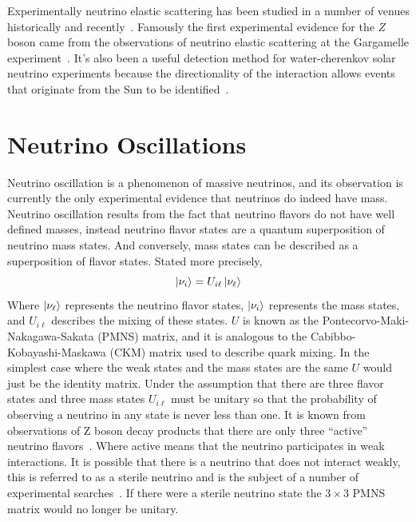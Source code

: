 Experimentally neutrino elastic scattering has been studied in a number
of venues historically and recently~\citep{reines2, es_measurement, nutev}.
Famously the first experimental evidence for the $Z$ boson came from
the observations of neutrino elastic scattering at the
Gargamelle experiment~\citep{gargamelle}.
It's also been a useful detection method for water-cherenkov solar
neutrino experiments because the directionality of the interaction
allows events that originate from the Sun to be identified~\citep{sno_first,
kamiokande, superk_first_solar}.

\section{Neutrino Oscillations}
\label{sec:neut_osc}
Neutrino oscillation is a phenomenon of massive neutrinos, and its observation
is currently the only experimental evidence that neutrinos do indeed have mass.
Neutrino oscillation results from the fact that neutrino flavors do not have
well defined masses, instead neutrino flavor states are a quantum superposition
of neutrino mass states.
And conversely, mass states can be described as a superposition of flavor states.
Stated more precisely,
\begin{equation}
    \ket{\nu_{i}} = U_{i\ell}\ket{\nu_\ell}
\end{equation}
Where $\ket{\nu_\ell}$ represents the neutrino flavor states, $\ket{\nu_i}$
represents the mass states, and $U_{i\ell}$ describes the mixing of these
states.
$U$ is known as the Pontecorvo-Maki-Nakagawa-Sakata (PMNS) matrix,
and it is analogous to the Cabibbo-Kobayashi-Maskawa (CKM) matrix used
to describe quark mixing.
In the simplest case where the weak states and the mass states are the same
$U$ would just be the identity matrix.
Under the assumption that there are three flavor states and three mass states
$U_{i\ell}$ must be unitary so that the probability of observing
a neutrino in any state is never less than one.
It is known from observations of Z boson decay products that
there are only three ``active'' neutrino flavors~\citep{Zdecay}.
Where active means that the neutrino participates in
weak interactions.
It is possible that there is a neutrino that does not interact
weakly, this is referred to as a sterile neutrino and is the
subject of a number of experimental searches~\citep{prospect, lsnd, miniboone, jsns2}.
If there were a sterile neutrino state the $3\times3$ PMNS matrix would
no longer be unitary.

